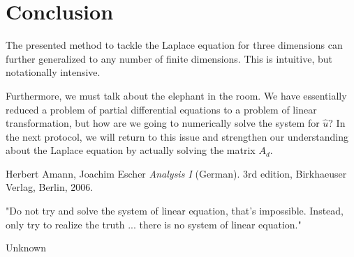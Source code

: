 \documentclass[refman]{article}
\theoremstyle{definition}
\begin{document}
	
	\newpage
    \justify
    
    
    
    
    
    
\section{Conclusion}
The presented method to tackle the Laplace equation for three dimensions can further generalized to any number of finite dimensions. This is intuitive, but notationally intensive.

Furthermore, we must talk about the elephant in the room. We have essentially reduced a problem of partial differential equations to a problem of linear transformation, but how are we going to numerically solve the system for \(\hat{u}\)? In the next protocol, we will return to this issue and strengthen our understanding about the Laplace equation by actually solving the matrix \(A_d\).
\medskip
\begin{thebibliography}{1}
    Herbert Amann, Joachim Escher
    \textit{Analysis I} (German). 
    3rd edition, Birkhaeuser Verlag, Berlin, 2006.
\end{thebibliography}

    \newpage
    \epigraph{"Do not try and solve the system of linear equation, that's impossible. Instead, only try to realize the truth ... there is no system of linear equation."}{Unknown}
\end{document}
